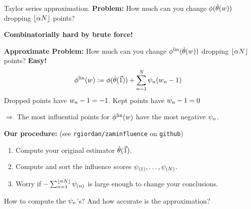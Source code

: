 \begin{frame}{Taylor series approximation.}
%
\textbf{Problem: }
%
How much can you change $\phi(\hat{\theta}(w))$
dropping $\lfloor \alpha N \rfloor$ points?

\textbf{Combinatorially hard by brute force!}

\hrulefill

\textbf{Approximate Problem: }
%
How much can you change $\phi^{\mathrm{lin}}(\hat{\theta}(w))$
dropping $\lfloor \alpha N \rfloor$ points?
%
\textbf{Easy! }
%
\begin{align*}
    \phi^{\mathrm{lin}}(w)
		:=  \phi(\hat{\theta}(\vec{1})) +
        \sum_{n=1}^N \psi_n (w_n -1)
\end{align*}
%
Dropped points have $w_n - 1 = -1$.  Kept points have $w_n - 1 = 0$

$\Rightarrow$ The most influential points for $\phi^{\mathrm{lin}}(w)$ have the
most negative $\psi_n$.

\hrulefill

\textbf{Our procedure:}  (see \texttt{rgiordan/zaminfluence} on \texttt{github})
\begin{enumerate}
    \item Compute your original estimator $\hat{\theta}(\vec{1})$.
    \item Compute and sort the influence scores
        $\psi_{(1)}, \ldots, \psi_{(N)}$.
    \item Worry if $- \sum_{n=1}^{\lfloor \alpha N \rfloor} \psi_{(n)}$ is large
    enough to change your conclusions.
\end{enumerate}

How to compute the $\psi_n$'s?  And how accurate is the approximation?

\end{frame}



